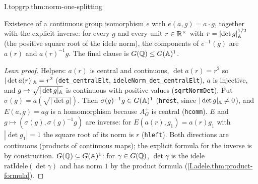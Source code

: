 \begin{theorem}[$G(\A)=\AGplus\times G(\A)^1$]
\end{theorem}
\begin{tfformal}{I.topgrp.thm:norm-one-splitting}
\begin{tffidelity}
Existence of a continuous group isomorphism $e$ with $e(a,g)=a\cdot g$, together with the explicit inverse: for every $g$ and every unit $r\in\mathbb{R}^\times$ with $r=\lvert\det g\rvert_{\mathbb{A}}^{1/2}$ (the positive square root of the idele norm), the components of $e^{-1}(g)$ are $a(r)$ and $a(r)^{-1}g$. The final clause is $G(\mathbb{Q})\le G(\mathbb{A})^1$.
\end{tffidelity}
\end{tfformal}
\begin{proof}[Lean proof]
Helpers: $a(r)$ is central and continuous, $\det a(r)=r^2$ so $|\det a(r)|_{\mathbb{A}}=r^2$ (\texttt{det\_centralElt}, \texttt{ideleNorm\_det\_centralElt}), $a$ is injective, and $g\mapsto\sqrt{|\det g|_{\mathbb{A}}}$ is continuous with positive values (\texttt{sqrtNormDet}). Put $\sigma(g)=a(\sqrt{|\det g|})$. Then $\sigma(g)^{-1}g\in G(\mathbb{A})^1$ (\texttt{hrest}, since $|\det g|_{\mathbb{A}}\neq 0$), and $E(a,g)=ag$ is a homomorphism because $A_G^+$ is central (\texttt{hcomm}). $E$ and $g\mapsto(\sigma(g),\sigma(g)^{-1}g)$ are inverse: for $E(a(r),g_1)=a(r)g_1$ with $|\det g_1|=1$ the square root of its norm is $r$ (\texttt{hleft}). Both directions are continuous (products of continuous maps); the explicit formula for the inverse is by construction. $G(\mathbb{Q})\subseteq G(\mathbb{A})^1$: for $\gamma\in G(\mathbb{Q})$, $\det\gamma$ is the idele $\mathrm{ratIdele}(\det\gamma)$ and has norm $1$ by the product formula (\cref{I.adele.thm:product-formula}).
\end{proof}

